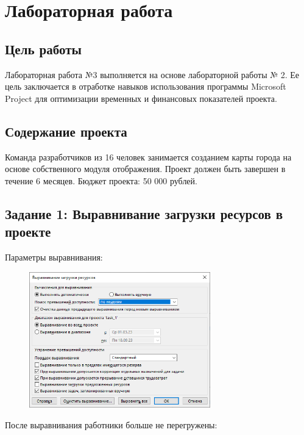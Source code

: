 \chapter{Лабораторная работа}

\section*{Цель работы}

Лабораторная работа №3 выполняется на основе лабораторной работы № 2. Ее цель заключается в отработке навыков использования программы Microsoft Project для оптимизации временных и финансовых показателей проекта.

\section*{Содержание проекта}

Команда разработчиков из 16 человек занимается созданием карты города на основе собственного модуля отображения. Проект должен быть завершен в течение 6 месяцев. Бюджет проекта: 50 000 рублей.

\section*{Задание 1: Выравнивание загрузки ресурсов в проекте}

Параметры выравнивания:

\begin{figure}[H]
	\begin{center}
		\includegraphics[width=0.7\textwidth]{imgs/task_1_0.png}
	\end{center}
\end{figure}

После выравнивания работники больше не перегружены:

